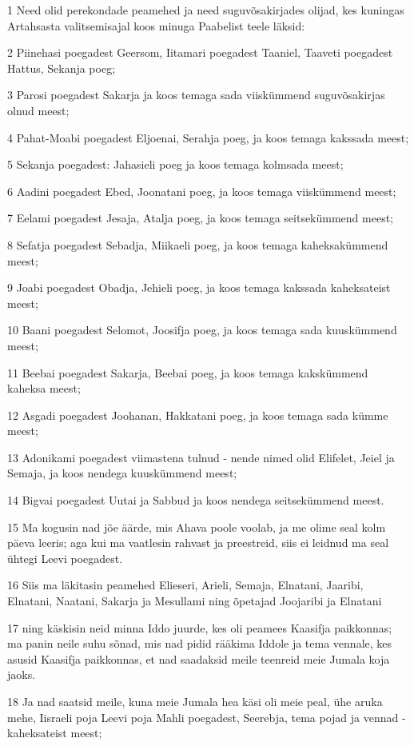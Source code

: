 \par 1 Need olid perekondade peamehed ja need suguvõsakirjades olijad, kes kuningas Artahsasta valitsemisajal koos minuga Paabelist teele läksid:
\par 2 Piinehasi poegadest Geersom, Iitamari poegadest Taaniel, Taaveti poegadest Hattus, Sekanja poeg;
\par 3 Parosi poegadest Sakarja ja koos temaga sada viiskümmend suguvõsakirjas olnud meest;
\par 4 Pahat-Moabi poegadest Eljoenai, Serahja poeg, ja koos temaga kakssada meest;
\par 5 Sekanja poegadest: Jahasieli poeg ja koos temaga kolmsada meest;
\par 6 Aadini poegadest Ebed, Joonatani poeg, ja koos temaga viiskümmend meest;
\par 7 Eelami poegadest Jesaja, Atalja poeg, ja koos temaga seitsekümmend meest;
\par 8 Sefatja poegadest Sebadja, Miikaeli poeg, ja koos temaga kaheksakümmend meest;
\par 9 Joabi poegadest Obadja, Jehieli poeg, ja koos temaga kakssada kaheksateist meest;
\par 10 Baani poegadest Selomot, Joosifja poeg, ja koos temaga sada kuuskümmend meest;
\par 11 Beebai poegadest Sakarja, Beebai poeg, ja koos temaga kakskümmend kaheksa meest;
\par 12 Asgadi poegadest Joohanan, Hakkatani poeg, ja koos temaga sada kümme meest;
\par 13 Adonikami poegadest viimastena tulnud - nende nimed olid Elifelet, Jeiel ja Semaja, ja koos nendega kuuskümmend meest;
\par 14 Bigvai poegadest Uutai ja Sabbud ja koos nendega seitsekümmend meest.
\par 15 Ma kogusin nad jõe äärde, mis Ahava poole voolab, ja me olime seal kolm päeva leeris; aga kui ma vaatlesin rahvast ja preestreid, siis ei leidnud ma seal ühtegi Leevi poegadest.
\par 16 Siis ma läkitasin peamehed Elieseri, Arieli, Semaja, Elnatani, Jaaribi, Elnatani, Naatani, Sakarja ja Mesullami ning õpetajad Joojaribi ja Elnatani
\par 17 ning käskisin neid minna Iddo juurde, kes oli peamees Kaasifja paikkonnas; ma panin neile suhu sõnad, mis nad pidid rääkima Iddole ja tema vennale, kes asusid Kaasifja paikkonnas, et nad saadaksid meile teenreid meie Jumala koja jaoks.
\par 18 Ja nad saatsid meile, kuna meie Jumala hea käsi oli meie peal, ühe aruka mehe, Iisraeli poja Leevi poja Mahli poegadest, Seerebja, tema pojad ja vennad - kaheksateist meest;
